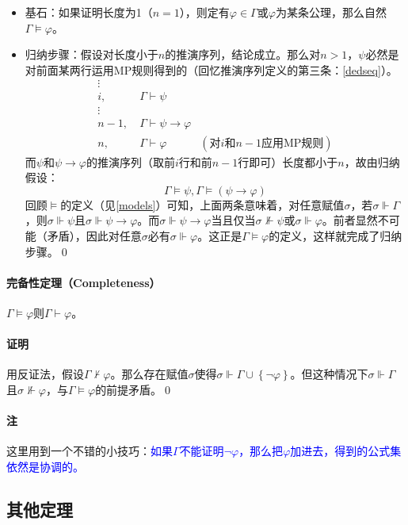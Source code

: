 \documentclass[b5paper,oneside]{ctexbook}
\newcommand{\Blue}[1]{\textcolor[named]{blue}{#1}}
\begin{document}
\begin{itemize}
\item 基石：如果证明长度为1（$n = 1$），则定有$\varphi\in\Gamma$或$\varphi$为某条公理，那么自然$\Gamma \models \varphi$。
\item 归纳步骤：假设对长度小于$n$的推演序列，结论成立。那么对$n>1$，$\psi$必然是对前面某两行运用MP规则得到的（回忆推演序列定义的第三条：\ref{dedseq}）。
\begin{align*}
\vdots\ &\ 
\\i,\ &\Gamma\vdash\psi
\\\vdots\ &\ 
\\n-1,\ &\Gamma\vdash\psi\rightarrow \varphi
\\n,\ &\Gamma\vdash\varphi\quad\quad\quad (\text{对}i\text{和}n-1\text{应用MP规则})
\end{align*}
而$\psi$和$\psi\to\varphi$的推演序列（取前$i$行和前$n-1$行即可）长度都小于$n$，故由归纳假设：
\[\Gamma\models\psi, \Gamma\models (\psi\to\varphi )\]
回顾$\models$的定义（见\ref{models}）可知，上面两条意味着，对任意赋值$\sigma$，若$\sigma\Vdash\Gamma$，则$\sigma\Vdash\psi$且$\sigma\Vdash\psi\to\varphi$。而$\sigma\Vdash\psi\to\varphi$当且仅当$\sigma\not\Vdash\psi$或$\sigma\Vdash\varphi$。前者显然不可能（矛盾），因此对任意$\sigma$必有$\sigma\Vdash\varphi$。这正是$\Gamma\models\varphi$的定义，这样就完成了归纳步骤。\hfill\qed
\end{itemize}

\paragraph{完备性定理（Completeness）}$\Gamma\models\varphi$则$\Gamma\vdash\varphi$。
\paragraph{证明}用反证法，假设$\Gamma\not\vdash \varphi$。那么存在赋值$\sigma$使得$\sigma \Vdash\Gamma\cup\left\lbrace \neg\varphi\right\rbrace$。但这种情况下$\sigma \Vdash \Gamma$且$\sigma\not\Vdash\varphi$，与$\Gamma\models\varphi$的前提矛盾。\hfill\qed

\paragraph{注}这里用到一个不错的小技巧：\Blue{如果$\Gamma$不能证明$\neg\varphi$，那么把$\varphi$加进去，得到的公式集依然是协调的。}
\subsection{其他定理}
\end{document}

